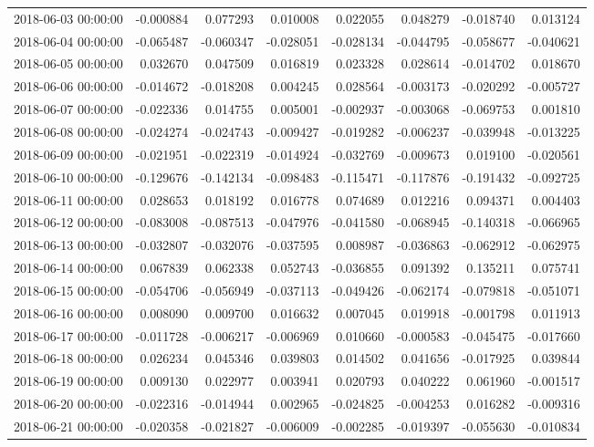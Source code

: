 \begin{tabular}{lrrrrrrr}
2018-06-03 00:00:00 & -0.000884 & 0.077293 & 0.010008 & 0.022055 & 0.048279 & -0.018740 & 0.013124 \\
2018-06-04 00:00:00 & -0.065487 & -0.060347 & -0.028051 & -0.028134 & -0.044795 & -0.058677 & -0.040621 \\
2018-06-05 00:00:00 & 0.032670 & 0.047509 & 0.016819 & 0.023328 & 0.028614 & -0.014702 & 0.018670 \\
2018-06-06 00:00:00 & -0.014672 & -0.018208 & 0.004245 & 0.028564 & -0.003173 & -0.020292 & -0.005727 \\
2018-06-07 00:00:00 & -0.022336 & 0.014755 & 0.005001 & -0.002937 & -0.003068 & -0.069753 & 0.001810 \\
2018-06-08 00:00:00 & -0.024274 & -0.024743 & -0.009427 & -0.019282 & -0.006237 & -0.039948 & -0.013225 \\
2018-06-09 00:00:00 & -0.021951 & -0.022319 & -0.014924 & -0.032769 & -0.009673 & 0.019100 & -0.020561 \\
2018-06-10 00:00:00 & -0.129676 & -0.142134 & -0.098483 & -0.115471 & -0.117876 & -0.191432 & -0.092725 \\
2018-06-11 00:00:00 & 0.028653 & 0.018192 & 0.016778 & 0.074689 & 0.012216 & 0.094371 & 0.004403 \\
2018-06-12 00:00:00 & -0.083008 & -0.087513 & -0.047976 & -0.041580 & -0.068945 & -0.140318 & -0.066965 \\
2018-06-13 00:00:00 & -0.032807 & -0.032076 & -0.037595 & 0.008987 & -0.036863 & -0.062912 & -0.062975 \\
2018-06-14 00:00:00 & 0.067839 & 0.062338 & 0.052743 & -0.036855 & 0.091392 & 0.135211 & 0.075741 \\
2018-06-15 00:00:00 & -0.054706 & -0.056949 & -0.037113 & -0.049426 & -0.062174 & -0.079818 & -0.051071 \\
2018-06-16 00:00:00 & 0.008090 & 0.009700 & 0.016632 & 0.007045 & 0.019918 & -0.001798 & 0.011913 \\
2018-06-17 00:00:00 & -0.011728 & -0.006217 & -0.006969 & 0.010660 & -0.000583 & -0.045475 & -0.017660 \\
2018-06-18 00:00:00 & 0.026234 & 0.045346 & 0.039803 & 0.014502 & 0.041656 & -0.017925 & 0.039844 \\
2018-06-19 00:00:00 & 0.009130 & 0.022977 & 0.003941 & 0.020793 & 0.040222 & 0.061960 & -0.001517 \\
2018-06-20 00:00:00 & -0.022316 & -0.014944 & 0.002965 & -0.024825 & -0.004253 & 0.016282 & -0.009316 \\
2018-06-21 00:00:00 & -0.020358 & -0.021827 & -0.006009 & -0.002285 & -0.019397 & -0.055630 & -0.010834 \\

\end{tabular}
